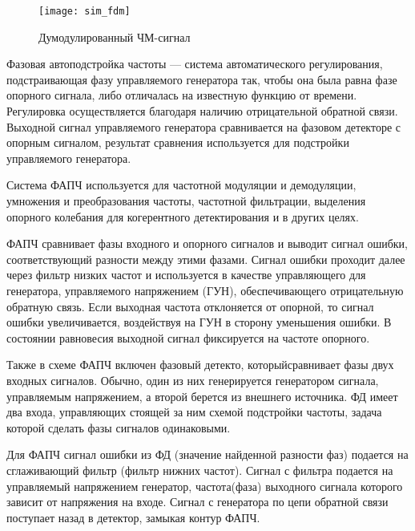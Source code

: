 \documentclass[10pt,a4paper]{article}
\begin{document}
\begin{figure}[h]\centering
    \texttt{[image: sim\_fdm]} 
    \caption{Думодулированный ЧМ-сигнал}\label{fig.sim_fdm}
\end{figure}
\FloatBarrier

Фазовая автоподстройка частоты — система автоматического регулирования, подстраивающая фазу управляемого генератора так, чтобы она была равна фазе опорного сигнала, либо отличалась на известную функцию от времени. Регулировка осуществляется благодаря наличию отрицательной обратной связи. Выходной сигнал управляемого генератора сравнивается на фазовом детекторе с опорным сигналом, результат сравнения используется для подстройки управляемого генератора.

Система ФАПЧ используется для частотной модуляции и демодуляции, умножения и преобразования частоты, частотной фильтрации, выделения опорного колебания для когерентного детектирования и в других целях.

ФАПЧ сравнивает фазы входного и опорного сигналов и выводит сигнал ошибки, соответствующий разности между этими фазами. Сигнал ошибки проходит далее через фильтр низких частот и используется в качестве управляющего для генератора, управляемого напряжением (ГУН), обеспечивающего отрицательную обратную связь. Если выходная частота отклоняется от опорной, то сигнал ошибки увеличивается, воздействуя на ГУН в сторону уменьшения ошибки. В состоянии равновесия выходной сигнал фиксируется на частоте опорного.

Также в схеме ФАПЧ включен фазовый детекто, которыйсравнивает фазы двух входных сигналов. Обычно, один из них генерируется генератором сигнала, управляемым напряжением, а второй берется из внешнего источника. ФД имеет два входа, управляющих стоящей за ним схемой подстройки частоты, задача которой сделать фазы сигналов одинаковыми.

Для ФАПЧ сигнал ошибки из ФД (значение найденной разности фаз) подается на сглаживающий фильтр (фильтр нижних частот). Сигнал с фильтра подается на управляемый напряжением генератор, частота(фаза) выходного сигнала которого зависит от напряжения на входе. Сигнал с генератора по цепи обратной связи поступает назад в детектор, замыкая контур ФАПЧ.
\end{document}
